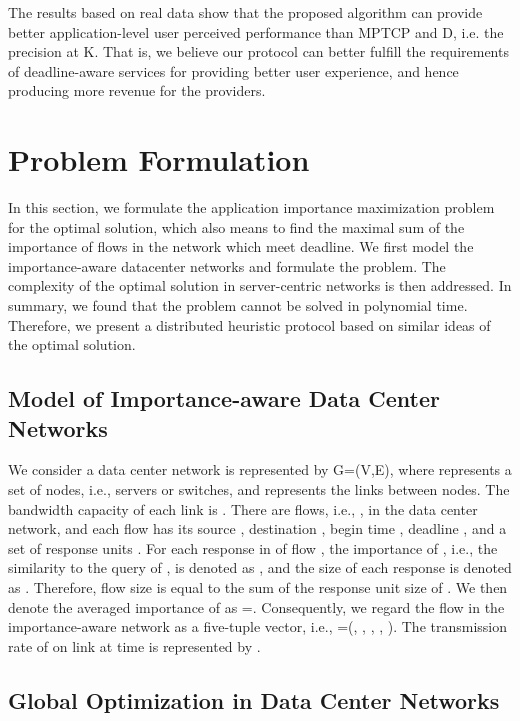 \documentclass[conference]{IEEEtran}
\begin{document}
The results based on real data show that the proposed algorithm can provide better application-level user perceived performance than MPTCP\cite{mptcp} and D\cite{deadline}, i.e. the precision at K. That is, we believe our protocol can better fulfill the requirements of deadline-aware services for providing better user experience, and hence producing more revenue for the providers.



\section{Problem Formulation}
In this section, we formulate the application importance maximization problem for the optimal solution, which also means to find the maximal sum of the importance of flows in the network which meet deadline. We first model the importance-aware datacenter networks and formulate the problem. The complexity of the optimal solution in server-centric networks is then addressed. In summary, we found that the problem cannot be solved in polynomial time. Therefore, we present a distributed heuristic protocol based on similar ideas of the optimal solution.

\subsection{Model of Importance-aware Data Center Networks}
We consider a data center network is represented by G=(V,E), where  represents a set of nodes, i.e., servers or switches, and  represents the links between nodes. The bandwidth capacity of each link  is . There are  flows, i.e., , in the data center network, and each flow has its source , destination , begin time , deadline , and a set of response units . For each response  in  of flow , the importance of , i.e., the similarity to the query of , is denoted as , and the size of each response  is denoted as . Therefore, flow size  is equal to the sum of the response unit size of . We then denote the averaged importance of  as =. Consequently, we regard the flow in the importance-aware network as a five-tuple vector, i.e., =(, , , , ). The transmission rate of  on link  at time  is represented by .

\subsection{Global Optimization in Data Center Networks}
\end{document}
